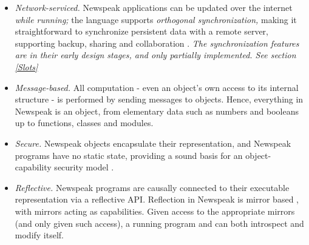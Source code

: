 \documentclass{article}
\begin{document}
\begin{itemize}
\item  {\em Network-serviced.} Newspeak applications can be updated over the internet {\em while running;} the language supports {\em orthogonal synchronization, } making it straightforward to synchronize persistent data with a remote server, supporting backup, sharing and collaboration \cite{bracha05}.
{\it
The synchronization features are in their early design stages, and only partially implemented. See section \ref{Slots}
}
\item  {\em Message-based.}  All computation  - even an object's own access to its internal structure - is performed by sending messages to objects. Hence, everything in Newspeak is an object, from elementary data such as numbers and booleans up to functions, classes and modules.
\item  {\em Secure.} Newspeak objects encapsulate their representation, and Newspeak programs have no static state, providing a sound basis for an object-capability security model \cite{RobustComposition}.

\item  {\em Reflective.} Newspeak programs are causally connected to their executable representation via a reflective API. Reflection in Newspeak is mirror based \cite{bracha-ungar04}, with mirrors acting as capabilities.   Given access to the appropriate mirrors (and only given such access), a running program and can both introspect and modify itself. 


\end{itemize}
\end{document}
